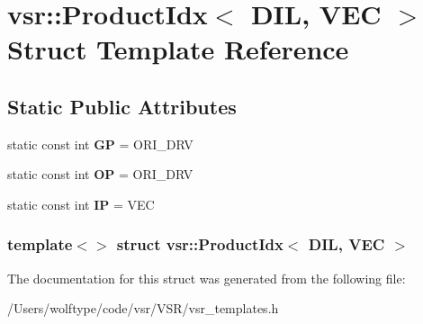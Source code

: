 \hypertarget{structvsr_1_1_product_idx_3_01_d_i_l_00_01_v_e_c_01_4}{\section{vsr\-:\-:Product\-Idx$<$ D\-I\-L, V\-E\-C $>$ Struct Template Reference}
\label{structvsr_1_1_product_idx_3_01_d_i_l_00_01_v_e_c_01_4}
}
\subsection*{Static Public Attributes}
\begin{DoxyCompactItemize}
\item 
\hypertarget{structvsr_1_1_product_idx_3_01_d_i_l_00_01_v_e_c_01_4_abdd5f8c14c3315b5d6cfe87836cdfbfb}{static const int {\bfseries G\-P} = O\-R\-I\-\_\-\-D\-R\-V}\label{structvsr_1_1_product_idx_3_01_d_i_l_00_01_v_e_c_01_4_abdd5f8c14c3315b5d6cfe87836cdfbfb}

\item 
\hypertarget{structvsr_1_1_product_idx_3_01_d_i_l_00_01_v_e_c_01_4_a6609a6766f356b27e7bf58977b80768b}{static const int {\bfseries O\-P} = O\-R\-I\-\_\-\-D\-R\-V}\label{structvsr_1_1_product_idx_3_01_d_i_l_00_01_v_e_c_01_4_a6609a6766f356b27e7bf58977b80768b}

\item 
\hypertarget{structvsr_1_1_product_idx_3_01_d_i_l_00_01_v_e_c_01_4_add5853c4fdc07fc0bd5b43cfb87efac2}{static const int {\bfseries I\-P} = V\-E\-C}\label{structvsr_1_1_product_idx_3_01_d_i_l_00_01_v_e_c_01_4_add5853c4fdc07fc0bd5b43cfb87efac2}

\end{DoxyCompactItemize}
\subsubsection*{template$<$$>$ struct vsr\-::\-Product\-Idx$<$ D\-I\-L, V\-E\-C $>$}



The documentation for this struct was generated from the following file\-:\begin{DoxyCompactItemize}
\item 
/\-Users/wolftype/code/vsr/\-V\-S\-R/vsr\-\_\-templates.\-h\end{DoxyCompactItemize}

